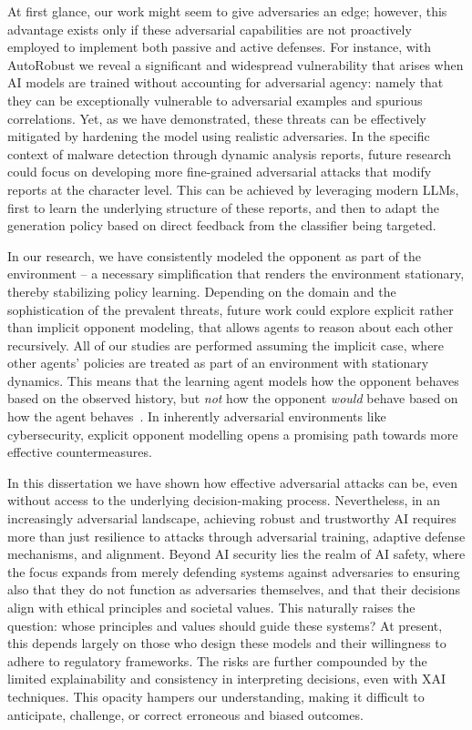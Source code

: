At first glance, our work might seem to give adversaries an edge; however, this advantage exists only if these adversarial capabilities are not proactively employed to implement both passive and active defenses. For instance, with AutoRobust we reveal a significant and widespread vulnerability that arises when AI models are trained without accounting for adversarial agency: namely that they can be exceptionally vulnerable to adversarial examples and spurious correlations.
Yet, as we have demonstrated, these threats can be effectively mitigated by hardening the model using realistic adversaries.
In the specific context of malware detection through dynamic analysis reports, future research could focus on developing more fine-grained adversarial attacks that modify reports at the character level.
This can be achieved by leveraging modern LLMs, first to learn the underlying structure of these reports, and then to adapt the generation policy based on direct feedback from the classifier being targeted.

In our research, we have consistently modeled the opponent as part of the environment -- a necessary simplification that renders the environment stationary, thereby stabilizing policy learning.
Depending on the domain and the sophistication of the prevalent threats, future work could explore explicit rather than implicit opponent modeling, that allows agents to reason about each other recursively.
All of our studies are performed assuming the implicit case, where other agents' policies are treated as part of an environment with stationary dynamics.
This means that the learning agent models how the opponent behaves based on the observed history, but \emph{not} how the opponent \emph{would} behave based on how the agent behaves~\cite{albrecht2018autonomous, wen2019probabilistic}.
In inherently adversarial environments like cybersecurity, explicit opponent modelling opens a promising path towards more effective countermeasures.

In this dissertation we have shown how effective adversarial attacks can be, even without access to the underlying decision-making process.
Nevertheless, in an increasingly adversarial landscape, achieving robust and trustworthy \gls{AI} requires more than just resilience to attacks through adversarial training, adaptive defense mechanisms, and alignment.
Beyond AI security lies the realm of AI safety, where the focus expands from merely defending systems against adversaries to ensuring also that they do not function as adversaries themselves, and that their decisions align with ethical principles and societal values.
This naturally raises the question: whose principles and values should guide these systems?
At present, this depends largely on those who design these models and their willingness to adhere to regulatory frameworks.
The risks are further compounded by the limited explainability and consistency in interpreting decisions, even with \gls{XAI} techniques. 
This opacity hampers our understanding, making it difficult to anticipate, challenge, or correct erroneous and biased outcomes.

